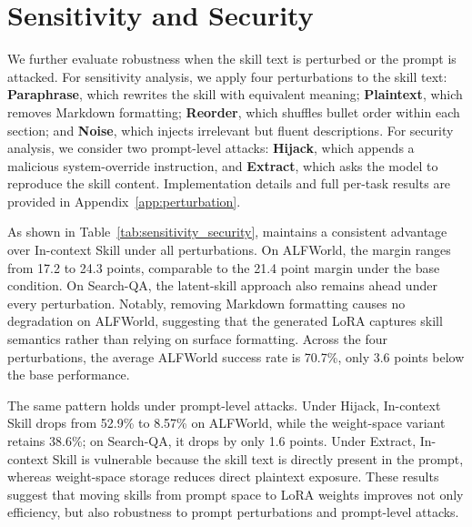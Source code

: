 \section{Sensitivity and Security}
We further evaluate robustness when the skill text is perturbed or the prompt is attacked. For sensitivity analysis, we apply four perturbations to the skill text: \textbf{Paraphrase}, which rewrites the skill with equivalent meaning; \textbf{Plaintext}, which removes Markdown formatting; \textbf{Reorder}, which shuffles bullet order within each section; and \textbf{Noise}, which injects irrelevant but fluent descriptions. For security analysis, we consider two prompt-level attacks: \textbf{Hijack}, which appends a malicious system-override instruction, and \textbf{Extract}, which asks the model to reproduce the skill content. Implementation details and full per-task results are provided in Appendix~\ref{app:perturbation}.

As shown in Table~\ref{tab:sensitivity_security}, \method{} maintains a consistent advantage over In-context Skill under all perturbations. On ALFWorld, the margin ranges from 17.2 to 24.3 points, comparable to the 21.4 point margin under the base condition. On Search-QA, the latent-skill approach also remains ahead under every perturbation. Notably, removing Markdown formatting causes no degradation on ALFWorld, suggesting that the generated LoRA captures skill semantics rather than relying on surface formatting. Across the four perturbations, the average ALFWorld success rate is 70.7\%, only 3.6 points below the base performance.

The same pattern holds under prompt-level attacks. Under Hijack, In-context Skill drops from 52.9\% to 8.57\% on ALFWorld, while the weight-space variant retains 38.6\%; on Search-QA, it drops by only 1.6 points. Under Extract, In-context Skill is vulnerable because the skill text is directly present in the prompt, whereas weight-space storage reduces direct plaintext exposure. These results suggest that moving skills from prompt space to LoRA weights improves not only efficiency, but also robustness to prompt perturbations and prompt-level attacks.
 
